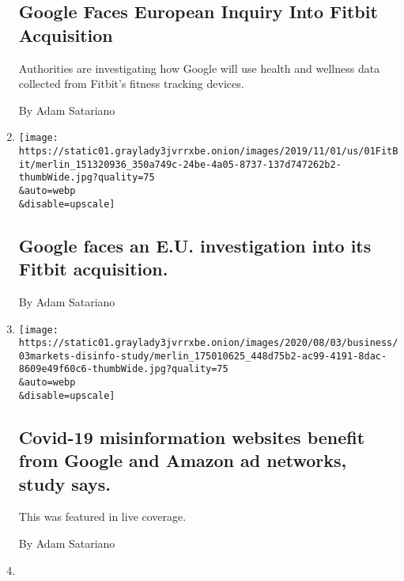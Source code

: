 \begin{enumerate}
  \hypertarget{google-faces-european-inquiry-into-fitbit-acquisition}{%
  \subsection{Google Faces European Inquiry Into Fitbit
  Acquisition}\label{google-faces-european-inquiry-into-fitbit-acquisition}}

  Authorities are investigating how Google will use health and wellness
  data collected from Fitbit's fitness tracking devices.

  By Adam Satariano
\item
  \href{/2020/08/04/business/google-faces-an-eu-investigation-into-its-fitbit-acquisition.html}{}

  \texttt{[image: https://static01.graylady3jvrrxbe.onion/images/2019/11/01/us/01FitBit/merlin\_151320936\_350a749c-24be-4a05-8737-137d747262b2-thumbWide.jpg?quality=75\\\&auto=webp\\\&disable=upscale]}

  \hypertarget{google-faces-an-eu-investigation-into-its-fitbit-acquisition}{%
  \subsection{Google faces an E.U. investigation into its Fitbit
  acquisition.}\label{google-faces-an-eu-investigation-into-its-fitbit-acquisition}}

  By Adam Satariano
\item
  \href{/live/2020/08/03/business/stock-market-today-coronavirus/covid-19-misinformation-websites-benefit-from-google-and-amazon-ad-networks-study-says}{}

  \texttt{[image: https://static01.graylady3jvrrxbe.onion/images/2020/08/03/business/03markets-disinfo-study/merlin\_175010625\_448d75b2-ac99-4191-8dac-8609e49f60c6-thumbWide.jpg?quality=75\\\&auto=webp\\\&disable=upscale]}

  \hypertarget{covid-19-misinformation-websites-benefit-from-google-and-amazon-ad-networks-study-says}{%
  \subsection{Covid-19 misinformation websites benefit from Google and
  Amazon ad networks, study
  says.}\label{covid-19-misinformation-websites-benefit-from-google-and-amazon-ad-networks-study-says}}

  This was featured in live coverage.

  By Adam Satariano
\item
  \href{/2020/07/30/technology/europe-new-phase-tech-amazon-apple-facebook-google.html}{}


\end{enumerate}
